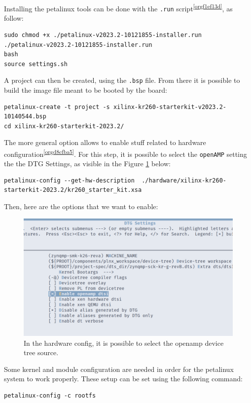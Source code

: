 \documentclass[10pt]{article}
\begin{document}
Installing the petalinux tools can be done with the \texttt{.run} script\textsuperscript{\ref{orgf1ef13d}}, as follow:
\begin{verbatim}
sudo chmod +x ./petalinux-v2023.2-10121855-installer.run
./petalinux-v2023.2-10121855-installer.run
bash
source settings.sh
\end{verbatim}

A project can then be created, using the \texttt{.bsp} file. From there it is possible to
build the image file meant to be booted by the board:
\begin{verbatim}
petalinux-create -t project -s xilinx-kr260-starterkit-v2023.2-10140544.bsp
cd xilinx-kr260-starterkit-2023.2/
\end{verbatim}


The more general option allows to enable stuff related to hardware
configuration\textsuperscript{\ref{orgd8cfba5}}. For this step, it is possible to select the \texttt{openAMP}
setting the the DTG Settings, as visible in the Figure \ref{fig:org5eb1858} below:
\begin{verbatim}
petalinux-config --get-hw-description  ./hardware/xilinx-kr260-starterkit-2023.2/kr260_starter_kit.xsa
\end{verbatim}

Then, here are the options that we want to enable:
\begin{figure}[htbp]
\centering
\includegraphics[width=.6\textwidth]{./img/yocto_openamp_dtg.png}
\caption{\label{fig:org5eb1858}In the hardware config, it is possible to select the openamp device tree source.}
\end{figure}

Some kernel and module configuration are needed in order for the petalinux system to work properly.
These setup can be set using the following command:
\begin{verbatim}
petalinux-config -c rootfs
\end{verbatim}
\end{document}
